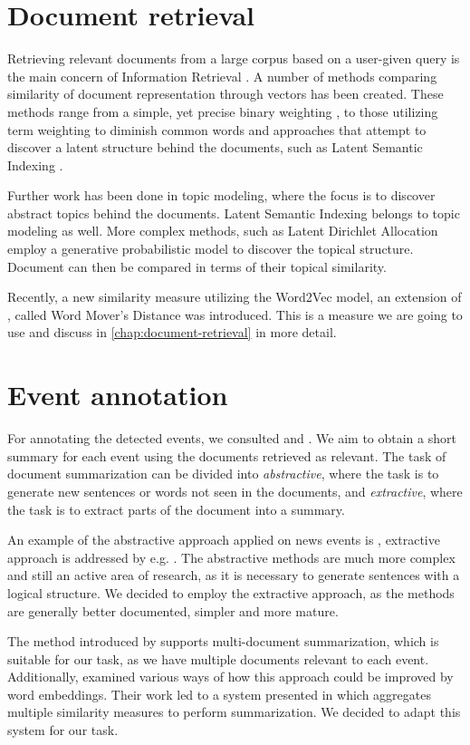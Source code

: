 \section{Document retrieval}
Retrieving relevant documents from a large corpus based on a user-given query is the main concern of Information Retrieval \citep{information-retrieval-2, information-retrieval}. A number of methods comparing similarity of document representation through vectors has been created. These methods range from a simple, yet precise binary weighting \citep{luhn, salton, information-retrieval}, to those utilizing term weighting to diminish common words \citep{tfidf} and approaches that attempt to discover a latent structure behind the documents, such as Latent Semantic Indexing \citep{lsi}.

Further work has been done in topic modeling, where the focus is to discover abstract topics behind the documents. Latent Semantic Indexing belongs to topic modeling as well. More complex methods, such as Latent Dirichlet Allocation \citep{lda} employ a generative probabilistic model to discover the topical structure. Document can then be compared in terms of their topical similarity.

Recently, a new similarity measure utilizing the Word2Vec model, an extension of \cite{emd}, called Word Mover's Distance \citep{wmd} was introduced. This is a measure we are going to use and discuss in \autoref{chap:document-retrieval} in more detail.

\section{Event annotation}
For annotating the detected events, we consulted \cite{summarization-survey-1} and \cite{summarization-survey-2}. We aim to obtain a short summary for each event using the documents retrieved as relevant. The task of document summarization can be divided into \textit{abstractive}, where the task is to generate new sentences or words not seen in the documents, and \textit{extractive}, where the task is to extract parts of the document into a summary.

An example of the abstractive approach applied on news events is \cite{heady}, extractive approach is addressed by e.g. \cite{sum-multi, multi-summarization-1, multi-summarization-2}. The abstractive methods are much more complex and still an active area of research, as it is necessary to generate sentences with a logical structure. We decided to employ the extractive approach, as the methods are generally better documented, simpler and more mature.

The method introduced by \cite{multi-summarization-1, multi-summarization-2} supports multi-document summarization, which is suitable for our task, as we have multiple documents relevant to each event. Additionally, \cite{mogren-1} examined various ways of how this approach could be improved by word embeddings. Their work led to a system presented in \cite{mogren-2} which aggregates multiple similarity measures to perform summarization. We decided to adapt this system for our task.
